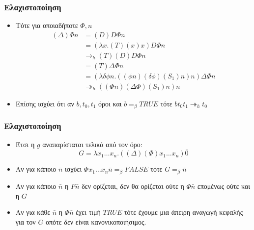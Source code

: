\documentclass{beamer}
\begin{document}
\begin{frame}
  \frametitle{Ελαχιστοποίηση}
  \begin{itemize}
  \item Τότε για οποιαδήποτε $\Phi, n$
    $$ \begin{array}{ll}
    (\Delta) \Phi n &= (D) D \Phi n \\
    &= (\lambda x. (T) (x) x) D \Phi n \\
    &\rightarrow_h (T) (D) D \Phi n \\
    &= (T) \Delta \Phi n \\
    &= (\lambda \delta \phi n . ((\phi n)(\delta \phi) (S_1) n) n)
    \Delta \Phi n \\
    &\twoheadrightarrow_h ((\Phi n) (\Delta \Phi) (S_1) n) n
  \end{array}$$
    \pause
  \item Επίσης ισχύει ότι αν $b, t_0, t_1$ όροι και $b =_\beta TRUE$
    τότε $ b t_0 t_1 \twoheadrightarrow_h t_0$
  \end{itemize}
\end{frame}

\begin{frame}
  \frametitle{Ελαχιστοποίηση}
  \begin{itemize}
  \item Έτσι η $g$ αναπαρίσταται τελικά από τον όρο:
    $$G = \lambda x_1 \ldots x_n . ((\Delta) (\Phi) x_1 \ldots x_n)
    \bar{0}$$ \pause
  \item Αν για κάποιο $\bar{n}$ ισχύει $\Phi x_1 \ldots x_n
    \bar{n}=_\beta FALSE$ τότε $G =_\beta\bar{n}$ \pause
  \item Αν για κάποιο $\bar{n}$ η $F \bar{n}$ δεν ορίζεται, δεν θα
    ορίζεται ούτε η $\Phi \bar{n}$ επομένως ούτε και η $G$ \pause
  \item Αν για κάθε $\bar{n}$ η $\Phi \bar{n}$ έχει τιμή $TRUE$ τότε
    έχουμε μια άπειρη αναγωγή κεφαλής για τον $G$ οπότε δεν είναι
    κανονικοποιήσιμος.
  \end{itemize}
\end{frame}
\end{document}
